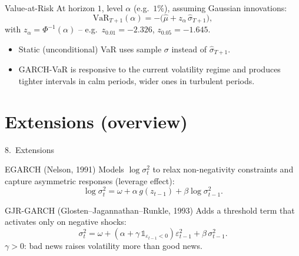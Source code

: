 \documentclass[aspectratio=169]{beamer}
\begin{document}
\begin{frame}{Value-at-Risk}
  At horizon $1$, level $\alpha$ (e.g.\ $1\%$), assuming Gaussian
  innovations:
  \[
    \mathrm{VaR}_{T+1}(\alpha)
    = -\bigl(\widehat\mu + z_\alpha\, \widehat\sigma_{T+1}\bigr),
  \]
  with $z_\alpha = \Phi^{-1}(\alpha)$ -- e.g.\
  $z_{0.01} = -2.326$, $z_{0.05} = -1.645$.
  \pause
  \begin{itemize}
    \item Static (unconditional) VaR uses sample $\sigma$ instead of
          $\widehat\sigma_{T+1}$.
    \item GARCH-VaR is responsive to the current volatility regime
          and produces tighter intervals in calm periods, wider
          ones in turbulent periods.
  \end{itemize}
\end{frame}

\section{Extensions (overview)}

\begin{frame}{8.~Extensions}
  \begin{block}{EGARCH (Nelson, 1991)}
    Models $\log \sigma_t^2$ to relax non-negativity constraints
    and capture asymmetric responses (leverage effect):
    \[
      \log \sigma_t^2 = \omega + \alpha\, g(z_{t-1}) + \beta \log
      \sigma_{t-1}^2.
    \]
  \end{block}
  \begin{block}{GJR-GARCH (Glosten--Jagannathan--Runkle, 1993)}
    Adds a threshold term that activates only on negative shocks:
    \[
      \sigma_t^2 = \omega + (\alpha + \gamma\, \mathbb 1_{\varepsilon_{t-1}<0})
                            \varepsilon_{t-1}^2
                          + \beta\, \sigma_{t-1}^2.
    \]
    $\gamma > 0$: bad news raises volatility more than good news.
  \end{block}
\end{frame}
\end{document}
